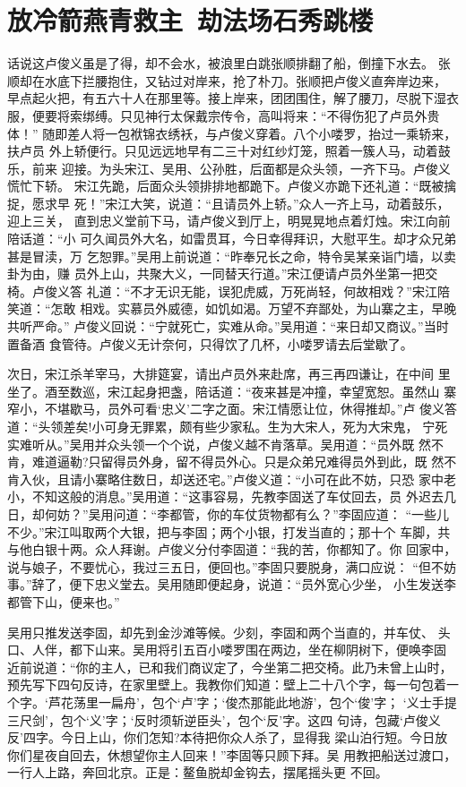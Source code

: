 \chapter{放冷箭燕青救主~劫法场石秀跳楼}

话说这卢俊义虽是了得，却不会水，被浪里白跳张顺排翻了船，倒撞下水去。
张顺却在水底下拦腰抱住，又钻过对岸来，抢了朴刀。张顺把卢俊义直奔岸边来，
早点起火把，有五六十人在那里等。接上岸来，团团围住，解了腰刀，尽脱下湿衣
服，便要将索绑缚。只见神行太保戴宗传令，高叫将来：“不得伤犯了卢员外贵体！”
随即差人将一包袱锦衣绣袄，与卢俊义穿着。八个小喽罗，抬过一乘轿来，扶卢员
外上轿便行。只见远远地早有二三十对红纱灯笼，照着一簇人马，动着鼓乐，前来
迎接。为头宋江、吴用、公孙胜，后面都是众头领，一齐下马。卢俊义慌忙下轿。
宋江先跪，后面众头领排排地都跪下。卢俊义亦跪下还礼道：“既被擒捉，愿求早
死！”宋江大笑，说道：“且请员外上轿。”众人一齐上马，动着鼓乐，迎上三关，
直到忠义堂前下马，请卢俊义到厅上，明晃晃地点着灯烛。宋江向前陪话道：“小
可久闻员外大名，如雷贯耳，今日幸得拜识，大慰平生。却才众兄弟甚是冒渎，万
乞恕罪。”吴用上前说道：“昨奉兄长之命，特令吴某亲诣门墙，以卖卦为由，赚
员外上山，共聚大义，一同替天行道。”宋江便请卢员外坐第一把交椅。卢俊义答
礼道：“不才无识无能，误犯虎威，万死尚轻，何故相戏？”宋江陪笑道：“怎敢
相戏。实慕员外威德，如饥如渴。万望不弃鄙处，为山寨之主，早晚共听严命。”
卢俊义回说：“宁就死亡，实难从命。”吴用道：“来日却又商议。”当时置备酒
食管待。卢俊义无计奈何，只得饮了几杯，小喽罗请去后堂歇了。

次日，宋江杀羊宰马，大排筵宴，请出卢员外来赴席，再三再四谦让，在中间
里坐了。酒至数巡，宋江起身把盏，陪话道：“夜来甚是冲撞，幸望宽恕。虽然山
寨窄小，不堪歇马，员外可看‘忠义’二字之面。宋江情愿让位，休得推却。”卢
俊义答道：“头领差矣!小可身无罪累，颇有些少家私。生为大宋人，死为大宋鬼，
宁死实难听从。”吴用并众头领一个个说，卢俊义越不肯落草。吴用道：“员外既
然不肯，难道逼勒?只留得员外身，留不得员外心。只是众弟兄难得员外到此，既
然不肯入伙，且请小寨略住数日，却送还宅。”卢俊义道：“小可在此不妨，只恐
家中老小，不知这般的消息。”吴用道：“这事容易，先教李固送了车仗回去，员
外迟去几日，却何妨？”吴用问道：“李都管，你的车仗货物都有么？”李固应道：
“一些儿不少。”宋江叫取两个大银，把与李固；两个小银，打发当直的；那十个
车脚，共与他白银十两。众人拜谢。卢俊义分付李固道：“我的苦，你都知了。你
回家中，说与娘子，不要忧心，我过三五日，便回也。”李固只要脱身，满口应说：
“但不妨事。”辞了，便下忠义堂去。吴用随即便起身，说道：“员外宽心少坐，
小生发送李都管下山，便来也。”

吴用只推发送李固，却先到金沙滩等候。少刻，李固和两个当直的，并车仗、
头口、人伴，都下山来。吴用将引五百小喽罗围在两边，坐在柳阴树下，便唤李固
近前说道：“你的主人，已和我们商议定了，今坐第二把交椅。此乃未曾上山时，
预先写下四句反诗，在家里壁上。我教你们知道：壁上二十八个字，每一句包着一
个字。‘芦花荡里一扁舟’，包个‘卢’字；‘俊杰那能此地游’，包个‘俊’字；
‘义士手提三尺剑’，包个‘义’字；‘反时须斩逆臣头’，包个‘反’字。这四
句诗，包藏‘卢俊义反’四字。今日上山，你们怎知?本待把你众人杀了，显得我
梁山泊行短。今日放你们星夜自回去，休想望你主人回来！”李固等只顾下拜。吴
用教把船送过渡口，一行人上路，奔回北京。正是：鳌鱼脱却金钩去，摆尾摇头更
不回。

